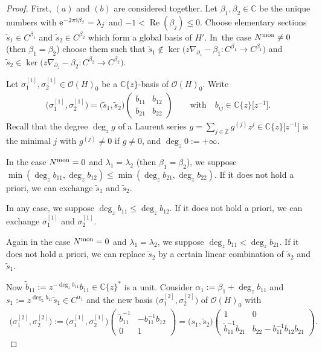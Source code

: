 \documentclass[10pt,a4paper]{amsart}
\numberwithin{equation}{section}
\numberwithin{figure}{section}
\newcommand{\Z}{{\mathbb Z}}
\newcommand{\C}{{\mathbb C}}
\newcommand{\OO}{{\mathcal O}}
\newcommand{\www}{\widetilde}
\newcommand{\paa}{\partial}
\newcommand{\nnn}{\nabla}
\DeclareMathOperator{\Ree}{Re}
\begin{document}
\begin{proof} First, $(a)$ and $(b)$ are considered together.
Let $\beta_1,\beta_2\in\C$ be the unique numbers
with ${\rm e}^{-2\pi {\rm i}\beta_j}=\lambda_j$ and
$-1<\Ree(\beta_j)\leq 0$. Choose elementary sections
$\www s_1\in C^{\beta_1}$ and
$\www s_2\in C^{\beta_2}$ which
form a global basis of $H'$. In~the case $N^{\rm mon}\neq 0$ (then $\beta_1=\beta_2$)
choose them such that
$\www s_1\notin \ker\big(z\nnn_{\paa_z}-\beta_1\colon C^{\beta_1}\to
C^{\beta_1}\big)$ and~$\www s_2\in\ker\big(z\nnn_{\paa_z}-\beta_2\colon
C^{\beta_2}\to C^{\beta_2}\big)$.

Let $\sigma_1^{[1]},\sigma_2^{[1]}\in\OO(H)_0$
be a $\C\{z\}$-basis of $\OO(H)_0$. Write
\begin{gather*}%
\big(\sigma_1^{[1]},\sigma_2^{[1]}\big)=\big(\www s_1,\www s_2\big)
\begin{pmatrix}
b_{11}& b_{12}\\b_{21}&b_{22}\end{pmatrix}
\qquad\text{with}\quad
b_{ij}\in\C\{z\}\big[z^{-1}\big].
\end{gather*}
Recall that the degree $\deg_z g$ of a Laurent series
$g=\sum_{j\in\Z}g^{(j)}z^j\in\C\{z\}\big[z^{-1}\big]$ is the
minimal $j$ with $g^{(j)}\neq 0$ if $g\neq 0$,
and $\deg_z0:=+\infty$.

In the case $N^{\rm mon}=0$ and $\lambda_1=\lambda_2$
(then $\beta_1=\beta_2$),
we suppose $\min(\deg_z b_{11},\deg_z b_{12})
\leq \min(\deg_z b_{21},\deg_z b_{22})$.
If it does not hold a priori, we can exchange
$\www s_1$ and $\www s_2$.

In any case, we suppose $\deg_z b_{11}\leq \deg_z b_{12}$.
If it does not hold a priori, we can exchange $\sigma_1^{[1]}$
and $\sigma_2^{[1]}$.

Again in the case $N^{\rm mon}=0$ and $\lambda_1=\lambda_2$,
we suppose $\deg_zb_{11}<\deg_zb_{21}$. If it does not hold
a priori, we can replace $\www s_2$ by a certain linear
combination of $\www s_2$ and $\www s_1$.

Now $\www b_{11}:=z^{-\deg_z b_{11}}b_{11}\in\C\{z\}^*$ is
a unit. Consider $\alpha_1:=\beta_1+\deg_z b_{11}$
and $s_1:=z^{\deg_z b_{11}}\www s_1\allowbreak\in C^{\alpha_1}$
and the new basis $\big(\sigma_1^{[2]},\sigma_2^{[2]}\big)$
of $\OO(H)_0$ with
\begin{gather*}
\big(\sigma_1^{[2]},\sigma_2^{[2]}\big)
:=\big(\sigma_1^{[1]},\sigma_2^{[1]}\big)
\begin{pmatrix} \www b_{11}^{-1} &-b_{11}^{-1}b_{12} \\
0 & 1 \end{pmatrix}
= \big(s_1,\www s_2\big)
\begin{pmatrix} 1 & 0 \\ \www b_{11}^{-1} b_{21} &
b_{22}-b_{11}^{-1}b_{12}b_{21}\end{pmatrix}\!.%
\end{gather*}


\end{proof}
\end{document}
